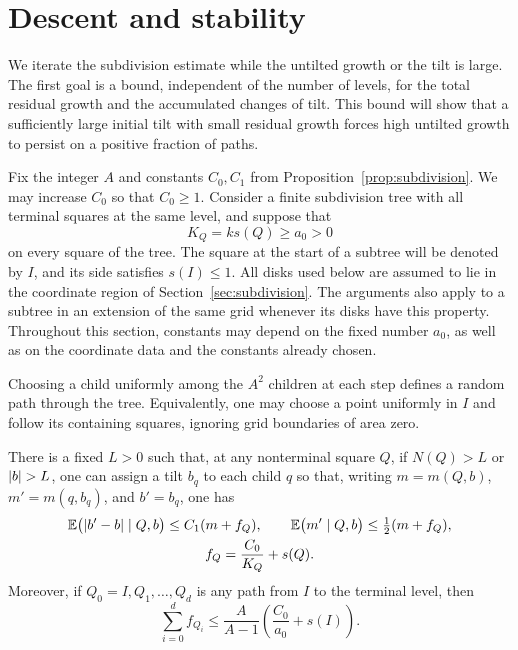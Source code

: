 \section{Descent and stability}\label{sec:descent}

We iterate the subdivision estimate while the untilted growth or the
tilt is large. The first goal is a bound, independent of the number of
levels, for the total residual growth and the accumulated changes of
tilt. This bound will show that a sufficiently large initial tilt with
small residual growth forces high untilted growth to persist on a
positive fraction of paths.

Fix the integer \(A\) and constants \(C_0,C_1\) from
Proposition~\ref{prop:subdivision}.  We may increase \(C_0\) so that
\(C_0\ge 1\).
Consider a finite subdivision tree with all terminal squares at the same
level, and suppose that
\[
K_Q=k s(Q)\ge a_0>0
\]
on every square of the tree.  The square at the start of a subtree will
be denoted by \(I\), and its side satisfies \(s(I)\le 1\).
All disks used below are assumed to lie in the coordinate region of
Section~\ref{sec:subdivision}.  The arguments also apply to a subtree
in an extension of the same grid whenever its disks have this property.
Throughout this section, constants may depend on the fixed number
\(a_0\), as well as on the coordinate data and the constants already
chosen.

Choosing a child uniformly among the \(A^2\) children at each step
defines a random path through the tree.  Equivalently, one may choose a
point uniformly in \(I\) and follow its containing squares, ignoring
grid boundaries of area zero.

\begin{lemma}\label{lem:descent}
There is a fixed \(L>0\) such that, at any nonterminal square \(Q\),
if \(N(Q)>L\) or \(\lvert b\rvert>L\), one can assign a tilt \(b_q\) to each
child \(q\) so that, writing
\(m=m(Q,b)\), \(m'=m(q,b_q)\), and \(b'=b_q\), one has
\begin{equation}\label{eq:descent}
 \begin{gathered}
 \mathbb E\bigl(\lvert b'-b\rvert\mid Q,b\bigr)\le C_1(m+f_Q),
 \qquad
 \mathbb E\bigl(m'\mid Q,b\bigr)\le \tfrac12(m+f_Q),\\
 f_Q=\frac{C_0}{K_Q}+s(Q).
 \end{gathered}
\end{equation}
Moreover, if \(Q_0=I,Q_1,\ldots,Q_d\) is any path from \(I\) to
the terminal level, then
\begin{equation}\label{eq:floors}
 \sum_{i=0}^{d}f_{Q_i}
 \le \frac{A}{A-1}
       \left(\frac{C_0}{a_0}+s(I)\right).
\end{equation}
\end{lemma}

